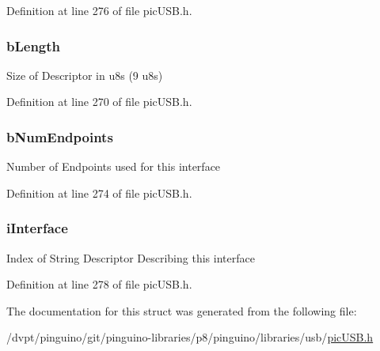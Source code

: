 Definition at line 276 of file pic\-U\-S\-B.\-h.

\hypertarget{struct_u_s_b___interface___descriptor_a904ce9aea3e1db94a9a1ec5a0a22b65d}{
\subsubsection[{b\-Length}]{ b\-Length}}\label{struct_u_s_b___interface___descriptor_a904ce9aea3e1db94a9a1ec5a0a22b65d}
Size of Descriptor in u8s (9 u8s) 

Definition at line 270 of file pic\-U\-S\-B.\-h.

\hypertarget{struct_u_s_b___interface___descriptor_a9a9163a4960fa710b2d655b8496b29ed}{
\subsubsection[{b\-Num\-Endpoints}]{ b\-Num\-Endpoints}}\label{struct_u_s_b___interface___descriptor_a9a9163a4960fa710b2d655b8496b29ed}
Number of Endpoints used for this interface 

Definition at line 274 of file pic\-U\-S\-B.\-h.

\hypertarget{struct_u_s_b___interface___descriptor_a08ba0e1160648c2e45d24d1f00484466}{
\subsubsection[{i\-Interface}]{ i\-Interface}}\label{struct_u_s_b___interface___descriptor_a08ba0e1160648c2e45d24d1f00484466}
Index of String Descriptor Describing this interface 

Definition at line 278 of file pic\-U\-S\-B.\-h.



The documentation for this struct was generated from the following file\-:\begin{DoxyCompactItemize}
\item 
/dvpt/pinguino/git/pinguino-\/libraries/p8/pinguino/libraries/usb/\hyperlink{pic_u_s_b_8h}{pic\-U\-S\-B.\-h}\end{DoxyCompactItemize}
